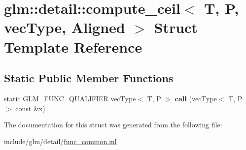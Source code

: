 \hypertarget{structglm_1_1detail_1_1compute__ceil}{}\section{glm\+:\+:detail\+:\+:compute\+\_\+ceil$<$ T, P, vec\+Type, Aligned $>$ Struct Template Reference}
\label{structglm_1_1detail_1_1compute__ceil}
\subsection*{Static Public Member Functions}
\begin{DoxyCompactItemize}
\item 
\mbox{\label{structglm_1_1detail_1_1compute__ceil_a0372c5733d1160f0200871177eab6e07}} 
static G\+L\+M\+\_\+\+F\+U\+N\+C\+\_\+\+Q\+U\+A\+L\+I\+F\+I\+ER vec\+Type$<$ T, P $>$ {\bfseries call} (vec\+Type$<$ T, P $>$ const \&x)
\end{DoxyCompactItemize}


The documentation for this struct was generated from the following file\+:\begin{DoxyCompactItemize}
\item 
include/glm/detail/\hyperlink{func__common_8inl}{func\+\_\+common.\+inl}\end{DoxyCompactItemize}
